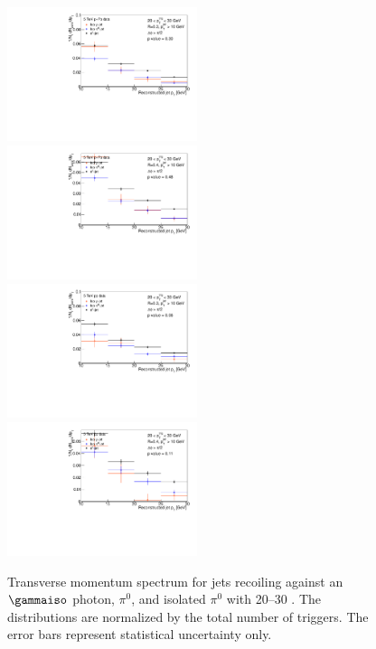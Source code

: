 \begin{figure}[h]
\centering
\includegraphics[width=0.495\textwidth]{GammaJet/Final_jetpt_step1_purity0_500_DATANAME_Out_Skimmed_13def_clus20_0_max30_0_JET_R0_3_PT_10_0_Iso1_5_root}
\includegraphics[width=0.495\textwidth]{GammaJet/Final_jetpt_step1_purity0_500_DATANAME_Out_Skimmed_13def_Lambda_clus20_0_max30_0_JET_R0_4_PT_10_0_Iso1_5_root}\\
\includegraphics[width=0.495\textwidth]{GammaJet/Final_jetpt_step1_purity0_500_DATANAME_Out_Skimmed_17q_clus20_0_max30_0_JET_R0_3_PT_10_0_Iso1_5_root}
\includegraphics[width=0.495\textwidth]{GammaJet/Final_jetpt_step1_purity0_500_DATANAME_Out_Skimmed_17q_Lambda_clus20_0_max30_0_JET_R0_4_PT_10_0_Iso1_5_root}
\caption{Transverse momentum spectrum for jets recoiling against an $\gammaiso$ photon, $\pi^{0}$, and isolated $\pi^{0}$ with 20--30 \GeVc. The distributions are normalized by the total number of triggers. The error bars represent statistical uncertainty only.}
\label{fig:FinalResults_ComparisonGammaPion}
\end{figure}

